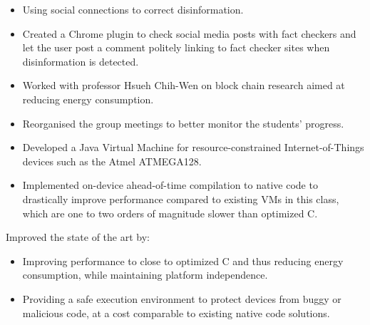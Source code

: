 \documentclass[10pt,a4paper]{../altacv}
\begin{document}
	\begin{itemize}
		\item Using social connections to correct disinformation.
		\smallskip
		\item Created a Chrome plugin to check social media posts with fact checkers and let the user post a comment politely linking to fact checker sites when disinformation is detected.
	\end{itemize}
	
	\medskip
	
	
	
	\newpage
	{\marginpar{\vspace*{\dimexpr1pt-\baselineskip}\raggedright}}
	
	\begin{itemize}
		\item Worked with professor Hsueh Chih-Wen on block chain research aimed at reducing energy consumption.
		\smallskip
		\item Reorganised the group meetings to better monitor the students' progress.
	\end{itemize}
	
	\medskip
	
	
	
	\bigskip\bigskip{}
	
	\begin{itemize}
		\item Developed a Java Virtual Machine for resource-constrained Internet-of-Things devices such as the Atmel ATMEGA128.
		\smallskip
		\item Implemented on-device ahead-of-time compilation to native code to drastically improve performance compared to existing VMs in this class, which are one to two orders of magnitude slower than optimized C.
	\end{itemize}
	
	\medskip
	
	Improved the state of the art by:
	
	\medskip
	
	\begin{itemize}
		\item Improving performance to close to optimized C and thus reducing energy consumption, while maintaining platform independence.
		\smallskip
		\item Providing a safe execution environment to protect devices from buggy or malicious code, at a cost comparable to existing native code solutions.
	\end{itemize}
	
\end{document}
